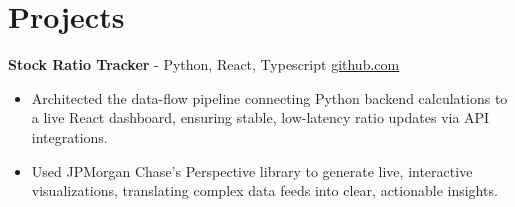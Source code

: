 \documentclass[11pt]{article}       %
\begin{document}

\vspace{-18.5pt}

\section*{Projects}

\textbf{Stock Ratio Tracker}{ - Python, React, Typescript} \hfill \href{https://github.com/Monica20030707/tradingDashboard-UI}{github.com} \\
\vspace{-9pt}
\begin{itemize}
  \item Architected the data-flow pipeline connecting Python backend calculations to a live React dashboard, ensuring stable, low-latency ratio updates via API integrations. 
  \item Used JPMorgan Chase’s Perspective library to generate live, interactive visualizations, translating complex data feeds into clear, actionable insights.
\end{itemize}

\end{document}
